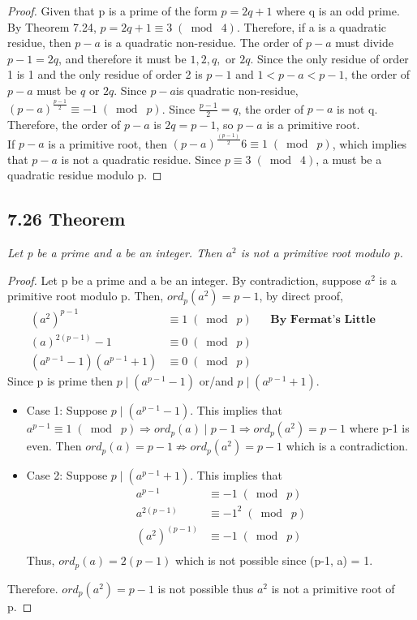 \documentclass{article}
\begin{document}
\begin{proof}
Given that p is a prime of the form $p=2q+1$ where q is an odd prime. By Theorem 7.24, $p = 2q + 1 \equiv 3 \;(\bmod\; 4)$. Therefore, if a is a quadratic residue, then $p-a$ is a quadratic non-residue. The order of $p-a$ must divide $p-1 = 2q$, and therefore it must be $1,2,q,$ or $2q$. Since the only residue of order 1 is 1 and the only residue of order 2 is $p-1$ and $1 < p-a < p-1$, the order of $p-a$ must be $q$ or $2q$. Since $p-a$is quadratic non-residue, $(p-a)^{\frac{p-1}{2}} \equiv -1 \;(\bmod\; p)$. Since $\frac{p-1}{2} = q$, the order of $p-a$ is not q. Therefore, the order of $p - a$ is $2q = p - 1$, so $p - a$ is a primitive root.\\

If $p - a$ is a primitive root, then $(p - a)^{\frac{(p-1)}{2}} 6 \equiv 1 \;(\bmod\; p)$, which implies that $p - a$ is
not a quadratic residue. Since $p \equiv 3 \;(\bmod\; 4)$, a must be a quadratic residue modulo p.
\end{proof}

\subsection*{7.26 Theorem} 
\quad \textit{Let p be a prime and a be an integer. Then $a^2$ is not a primitive root modulo p.}

\begin{proof}
Let p be a prime and a be an integer. By contradiction, suppose $a^2$ is a primitive root modulo p. Then, $ord_p(a^2) = p-1$, by direct proof,
\begin{align*}
    &&(a^2)^{p-1} &\equiv 1 \;(\bmod\; p)&&\textbf{By Fermat's Little Theorem}\\
    &&(a)^{2(p-1)} - 1&\equiv 0 \;(\bmod\; p)&&\\
    &&(a^{p-1} - 1)(a^{p-1} + 1)&\equiv 0 \;(\bmod\; p)&&
\end{align*}
Since p is prime then $p \mid (a^{p-1} - 1)$ or/and $p \mid (a^{p-1} + 1)$.
\begin{itemize}
    \item Case 1: Suppose $p \mid (a^{p-1} - 1)$. This implies that $a^{p-1} \equiv 1 \;(\bmod\; p) \Longrightarrow ord_p(a) \mid p-1 \Longrightarrow ord_p(a^2) = p - 1$ where p-1 is even. Then $ ord_p(a) = p - 1 \not\Longrightarrow  ord_p(a^2) = p - 1$ which is a contradiction.
    \item Case 2: Suppose $p \mid (a^{p-1} + 1)$. This implies that
    \begin{align*}
        &&a^{p-1} &\equiv -1 \;(\bmod\; p)&&\\
        &&a^{2(p-1)} &\equiv -1^2 \;(\bmod\; p)&&\\
        &&(a^2)^{(p-1)} &\equiv -1 \;(\bmod\; p)&&\\
    \end{align*}
    Thus, $ord_p(a) = 2(p-1)$ which is not possible since (p-1, a) = 1.
\end{itemize}
Therefore. $ord_p(a^2) = p-1$ is not possible thus $a^2$ is not a primitive root of p.
\end{proof}
\end{document}
